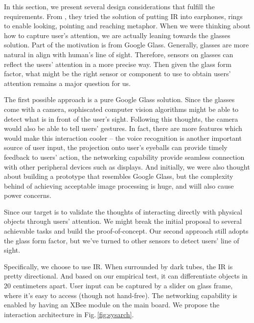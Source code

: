 In this section, we present several design considerations that fulfill the requirements. From \cite{Merrill:2007:ALP:1758156.1758158}, they tried the solution of putting IR into earphones, rings to enable looking, pointing and reaching metaphor. When we were thinking about how to capture user's attention, we are actually leaning towards the glasses solution. Part of the motivation is from Google Glass. Generally, glasses are more natural in align with human's line of sight. Therefore, sensors on glasses can reflect the users' attention in a more precise way. Then given the glass form factor, what might be the right sensor or component to use to obtain users' attention remains a major question for us.

The first possible approach is a pure Google Glass solution. Since the glasses come with a camera, sophiscated computer vision algorithms might be able to detect what is in front of the user's sight. Following this thoughts, the camera would also be able to tell users' gestures. In fact, there are more features which would make this interaction cooler -- the voice recognition is another important source of user input, the projection onto user's eyeballs can provide timely feedback to users' action, the networking capability provide seamless connection with other peripheral devices such as displays. And initially, we were also thought about building a prototype that resembles Google Glass, but the complexity behind of achieving acceptable image processing is huge, and wiill also cause power concerns.

Since our target is to validate the thoughts of interacting directly with physical objects through users' attention. We might break the initial proposal to several achievable tasks and build the proof-of-concept. Our second approach still adopts the glass form factor, but we've turned to other sensors to detect users' line of sight. 

Specifically, we choose to use IR. When surrounded by dark tubes, the IR is pretty directional. And based on our empirical test, it can differentiate objects in 20 centimeters apart.
User input can be captured by a slider on glass frame, where it's easy to access (though not hand-free). The networking capability is enabled by having an XBee module on the main board. We propose the interaction architecture in Fig.\,\ref{fig:sysarch}.

